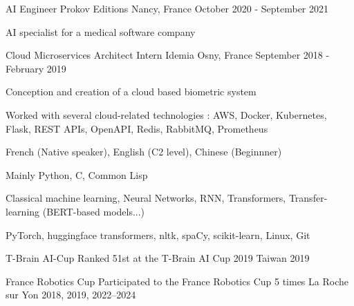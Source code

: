 \documentclass[11pt, a4paper]{awesome-cv}
\begin{document}

\begin{cventries}

  \cventry
  {AI Engineer}
  {Prokov Editions}
  {Nancy, France}
  {October 2020 - September 2021}
  {
    \begin{cvitems}
      \item AI specialist for a medical software company
    \end{cvitems}
  }

  \cventry
  {Cloud Microservices Architect Intern}
  {Idemia}
  {Osny, France}
  {September 2018 - February 2019}
  {
    \begin{cvitems}
      \item Conception and creation of a cloud based biometric system
      \item Worked with several cloud-related technologies : AWS, Docker, Kubernetes, Flask, REST APIs, OpenAPI, Redis, RabbitMQ, Prometheus
    \end{cvitems}
  }

\end{cventries}



\begin{cvskills}
  {French (Native speaker), English (C2 level), Chinese (Beginnner)}
  
  {Mainly Python, C, Common Lisp}

  {Classical machine learning, Neural Networks, RNN, Transformers, Transfer-learning (BERT-based models...)}

  {PyTorch, huggingface transformers, nltk, spaCy, scikit-learn, Linux, Git}
\end{cvskills}



\begin{cvhonors}
  \cvhonor
  {T-Brain AI-Cup}
  {Ranked 51st at the T-Brain AI Cup 2019}
  {Taiwan}
  {2019}
  
  \cvhonor
  {France Robotics Cup}
  {Participated to the France Robotics Cup 5 times}
  {La Roche sur Yon}
  {2018, 2019, 2022--2024}
\end{cvhonors}


\newpage
{}

\nocite{*}
\printbibliography[heading=none]
\end{document}
